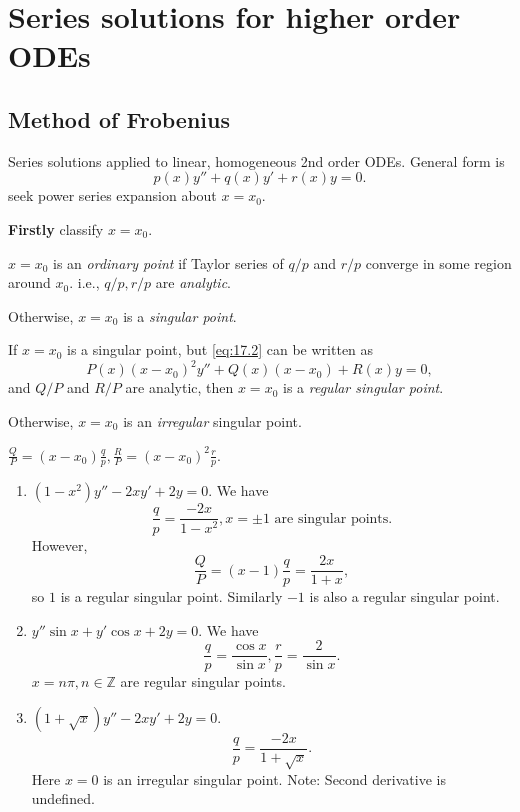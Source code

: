 \documentclass[10pt]{article}
\newcommand{\bluecomment}[1]{{\color{blue}#1}}
\begin{document}
    \section{Series solutions for higher order ODEs}
    \subsection{Method of Frobenius}
    Series solutions applied to linear, homogeneous 2nd order ODEs. General form is 
    \begin{equation}\label{eq:17.2}
        p(x)y''+q(x)y'+r(x)y=0.
    \end{equation}
    seek power series expansion about $x=x_0$.
    
    \textbf{Firstly} classify $x=x_0$.
    \begin{definition}
        $x=x_0$ is an \textit{ordinary point} if Taylor series of $ q/p $ and $ r/p $ converge in some region around $x_0$. i.e., $ q/p, r/p $ are \textit{analytic}.

        Otherwise, $x=x_0$ is a \textit{singular point}.
    \end{definition} 
    \begin{definition}
        If $x=x_0$ is a singular point, but \ref{eq:17.2} can be written as 
        \[
            P(x)(x-x_0)^2y''+Q(x)(x-x_0)+R(x)y=0
        ,\]
        and $Q/P$ and $R/P$ are analytic, then $x=x_0$ is a \textit{regular singular point}.

        Otherwise, $x=x_0$ is an \textit{irregular} singular point.
    \end{definition}
    \begin{remark}
        $\displaystyle \frac{Q}{P}=(x-x_0)\frac{q}{p}, \frac{R}{P}=(x-x_0)^2\frac{r}{p}$. 
    \end{remark}
    \begin{example}
        \begin{enumerate}
            \item $ (1-x^2)y''-2xy'+2y=0 $. We have 
            \[
                \frac{q}{p}=\frac{-2x}{1-x^2}, x=\pm 1\text{ are singular points}
            .\]
            However, 
            \[
                \frac{Q}{P} = (x-1)\frac{q}{p}=\frac{2x}{1+x}
            ,\]
            so $1$ is a regular singular point. Similarly $-1$ is also a regular singular point.
            \item $ y'' \sin x + y' \cos x+2y=0 $. We have 
            \[
                \frac{q}{p}=\frac{\cos x}{\sin x}, \frac{r}{p}=\frac{2}{\sin x}
            .\]
            $ x=n\pi, n\in \mathbb{Z} $ are regular singular points.
            \item $ (1+\sqrt{x})y''-2xy'+2y=0 $.
            \[
                \frac{q}{p}=\frac{-2x}{1+\sqrt{x}}
            .\]
            Here $x=0$ is an irregular singular point.
            \bluecomment{Note: Second derivative is undefined.}
        \end{enumerate}
    \end{example}
\end{document}
